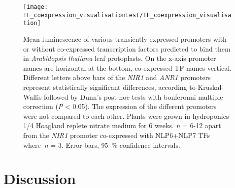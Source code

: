\begin{figure}[!h]
\begin{center}
\capstart
\texttt{[image: TF\_coexpression\_visualisationtest/TF\_coexpression\_visualisation]}
\caption{
Mean luminescence of various transiently expressed promoters with or without co\hyp{}expressed transcription factors predicted to bind them in \textit{Arabidopsis thaliana} leaf protoplasts.
On the x\hyp{}axis promoter names are horizontal at the bottom, co\hyp{}expressed TF names vertical. Different letters above bars of the \textit{NIR1} and \textit{ANR1} promoters represent statistically significant differences, according to Kruskal-Wallis followed by Dunn's post-hoc tests with bonferonni multiple correction (\textit{P} \textless{} 0.05). The expression of the different promoters were not compared to each other.
Plants were grown in hydroponics 1/4 Hoagland replete nitrate medium for 6 weeks.
\textit{n} = 6\hyp{}12 apart from the \textit{NIR1} promoter co\hyp{}expressed with NLP6+NLP7 TFs where~\textit{n} = 3.
Error bars, \SI{95}{\percent} confidence intervals.
\label{fig:co-expression}
}
\end{center}
\end{figure}

\section{Discussion}{\label{discussion}}

